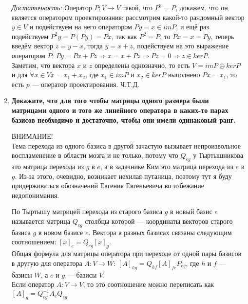 \documentclass[12pt]{article} %
\begin{document}
\begin{enumerate}
    \textit{Достаточность:} Оператор $P : V \rightarrow V$ такой, что $P^2 = P$, докажем, что он является оператором проектирования: рассмотрим какой-то рандомный вектор $y \in V$ и подействуем на него оператором $Py = x \in imP$, и ещё раз подействуем $P^2y = P(Py) = Px$, так как $P^2 = P$, то $Px = x = Py$, теперь введём вектор $z = y - x$, тогда $y = x + z$, подействуем на это выражение оператором $P$: $Py = Px + Pz \Rightarrow x = x + Pz \Rightarrow Pz = 0 \Rightarrow z \in kerP$.\\
    Заметим, что вектора $x$ и $z$ определены однозначно, то есть $V = imP \oplus kerP$ и  для $\forall x \in V x = x_1 + x_2$, где $x_1 \in imP$ и $x_2 \in kerP$ выполнено $Px = x_1$, то есть $p$ --- оператор проектирования. Ч.Т.Д.
    
    \item \textbf{Докажите, что для того чтобы матрицы одного размера были матрицами одного и того же линейного оператора в каких-то парах базисов необходимо и достаточно, чтобы они имели одинаковый ранг.}\\

    \begin{center}
        ВНИМАНИЕ!\\
        Тема перехода из одного базиса в другой зачастую вызывает непроизвольное воспламенение в области мозга и не только, потому что $Q_{eg}$ у Тыртышникова это матрица перехода из $g$ в $e$, а в задачнике Ким это матрица перехода из $e$ в $g$. Из-за этого, очевидно, возникает нехилая путаница, поэтому тут я буду придерживаться обозначений Евгения Евгеньевича во избежание недопонимания.
    \end{center}

    По Тыртышу матрицей перехода из старого базиса $g$ в новый базис $e$ называется матрица $Q_{eg}$ столбцы которой --- координаты векторов старого базиса $g$ в новом базисе $e$. Вектора в разных базисах связаны следующим соотношением: $[x]_e = Q_{eg}[x]_g$.\\
    
    Общая формула для матрицы оператора при переходе от одной пары базисов в другую для оператора $A: V \rightarrow W$: $[A]_{hg} = Q_{hf}[A]_{fe}P_{eg}$, где $h$ и $f$ --- базисы $W$, а $e$ и $g$ --- базисы $V$.\\

    Если оператор $A: V \rightarrow V$, то это соотношение можно переписать как $[A]_g = Q_{eg}^{-1}A_eQ_{eg}$


\end{enumerate}
\end{document}
